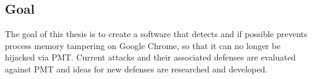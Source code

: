\subsection{Goal}
The goal of this thesis is to create a software that detects and if possible prevents process memory tampering on Google Chrome, so that it can no longer be hijacked via PMT. Current attacks and their associated defenses are evaluated against PMT and ideas for new defenses are researched and developed.